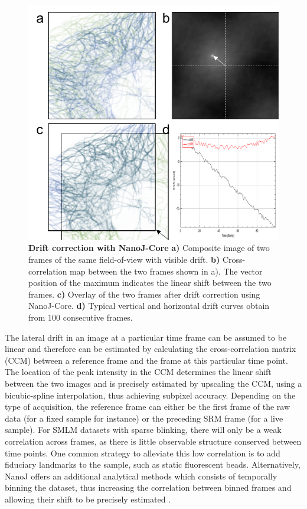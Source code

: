  \begin{figure}[!t]
    \centering
    \includegraphics[width=\linewidth]{Figures/Fig2_Drift_Initial.png}
    \caption{\textbf{Drift correction with NanoJ-Core} \textbf{a)} Composite image of two frames of the same field-of-view with visible drift. \textbf{b)} Cross-correlation map between the two frames shown in a). The vector position of the maximum indicates the linear shift between the two frames. \textbf{c)} Overlay of the two frames after drift correction using NanoJ-Core. \textbf{d)} Typical vertical and horizontal drift curves obtain from 100 consecutive frames.}
    \label{fig:DriftCorrection}
 \end{figure}

 The lateral drift in an image at a particular time frame can be assumed to be linear and therefore can be estimated by calculating the cross-correlation matrix (CCM) between a reference frame and the frame at this particular time point. The location of the peak intensity in the CCM determines the linear shift between the two images and is precisely estimated by upscaling the CCM, using a bicubic-spline interpolation, thus achieving subpixel accuracy. Depending on the type of acquisition, the reference frame can either be the first frame of the raw data (for a fixed sample for instance) or the preceding SRM frame (for a live sample). For SMLM datasets with sparse blinking, there will only be a weak correlation across frames, as there is little observable structure conserved between time points. One common strategy to alleviate this low correlation is to add fiduciary landmarks to the sample, such as static fluorescent beads. Alternatively, NanoJ offers an additional analytical methods which consists of temporally binning the dataset, thus increasing the correlation between binned frames and allowing their shift to be precisely estimated \cite{mlodzianoski2011sample}. 

